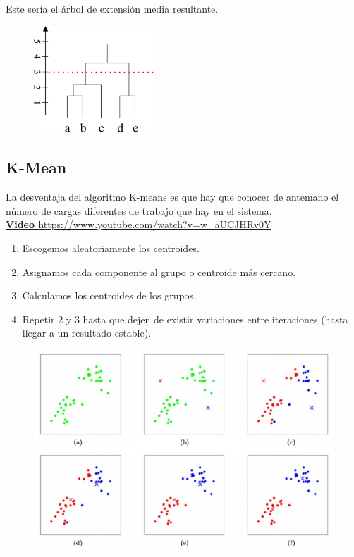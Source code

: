 Este sería el árbol de extensión media resultante.
\begin{figure}[H]
    \centering
    \includegraphics[width=0.4\textwidth]{Images/MST4.png}
\end{figure}
\subsection{K-Mean}
La desventaja del algoritmo K-means es que hay que conocer de antemano el número de cargas  diferentes de trabajo que hay en el sistema.\\

\textbf{\href{https://www.youtube.com/watch?v=w_aUCJHRv0Y}{Video }}\url{ https://www.youtube.com/watch?v=w_aUCJHRv0Y}\\

\begin{enumerate}[label=\arabic*)]
    \item Escogemos aleatoriamente los centroides.
    \item Asignamos cada componente al grupo o centroide más cercano.
    \item Calculamos los centroides de los grupos.
    \item Repetir 2 y 3 hasta que dejen de existir variaciones entre iteraciones (hasta llegar a un resultado estable).
\end{enumerate}
\begin{figure}[H]
    \centering
    \includegraphics[width=\textwidth]{Images/kmeans.png}
\end{figure}
